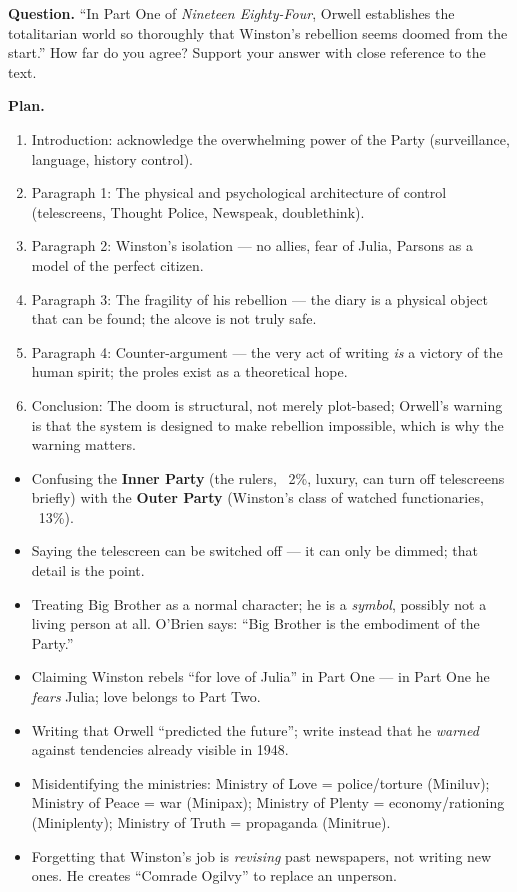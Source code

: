 \documentclass[11pt]{article}
\begin{document}
\begin{exemplebox}
\textbf{Question.} ``In Part One of \emph{Nineteen Eighty-Four}, Orwell establishes the totalitarian world so thoroughly that Winston's rebellion seems doomed from the start.'' How far do you agree? Support your answer with close reference to the text.

\textbf{Plan.}
\begin{enumerate}
\item Introduction: acknowledge the overwhelming power of the Party (surveillance, language, history control).
\item Paragraph 1: The physical and psychological architecture of control (telescreens, Thought Police, Newspeak, doublethink).
\item Paragraph 2: Winston's isolation --- no allies, fear of Julia, Parsons as a model of the perfect citizen.
\item Paragraph 3: The fragility of his rebellion --- the diary is a physical object that can be found; the alcove is not truly safe.
\item Paragraph 4: Counter-argument --- the very act of writing \emph{is} a victory of the human spirit; the proles exist as a theoretical hope.
\item Conclusion: The doom is structural, not merely plot-based; Orwell's warning is that the system is designed to make rebellion impossible, which is why the warning matters.
\end{enumerate}
\end{exemplebox}

\begin{attention}
\begin{itemize}
\item Confusing the \textbf{Inner Party} (the rulers, ~2\%, luxury, can turn off telescreens briefly) with the \textbf{Outer Party} (Winston's class of watched functionaries, ~13\%).
\item Saying the telescreen can be switched off --- it can only be dimmed; that detail is the point.
\item Treating Big Brother as a normal character; he is a \emph{symbol}, possibly not a living person at all. O'Brien says: ``Big Brother is the embodiment of the Party.''
\item Claiming Winston rebels ``for love of Julia'' in Part One --- in Part One he \emph{fears} Julia; love belongs to Part Two.
\item Writing that Orwell ``predicted the future''; write instead that he \emph{warned} against tendencies already visible in 1948.
\item Misidentifying the ministries: Ministry of Love = police/torture (Miniluv); Ministry of Peace = war (Minipax); Ministry of Plenty = economy/rationing (Miniplenty); Ministry of Truth = propaganda (Minitrue).
\item Forgetting that Winston's job is \emph{revising} past newspapers, not writing new ones. He creates ``Comrade Ogilvy'' to replace an unperson.
\end{itemize}
\end{attention}
\end{document}
